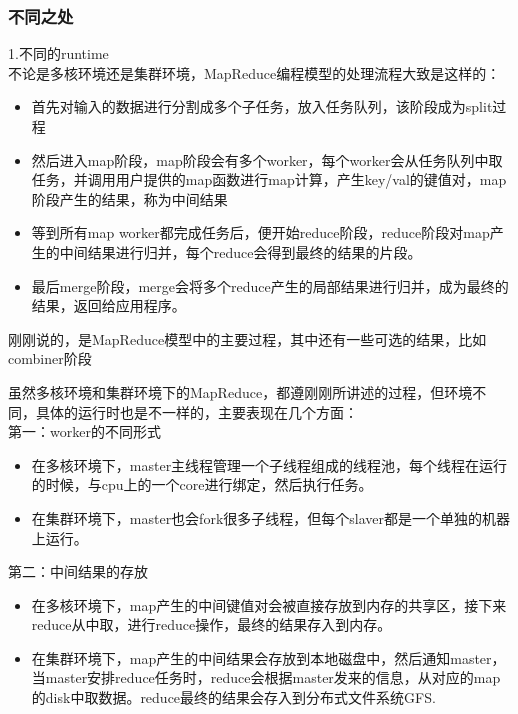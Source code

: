 \subsubsection{不同之处}
1.不同的runtime\\
不论是多核环境还是集群环境，MapReduce编程模型的处理流程大致是这样的：
\begin{itemize}
  \item 首先对输入的数据进行分割成多个子任务，放入任务队列，该阶段成为split过程
  \item 然后进入map阶段，map阶段会有多个worker，每个worker会从任务队列中取任务，并调用用户提供的map函数进行map计算，产生key/val的键值对，map阶段产生的结果，称为中间结果
  \item 等到所有map worker都完成任务后，便开始reduce阶段，reduce阶段对map产生的中间结果进行归并，每个reduce会得到最终的结果的片段。
  \item 最后merge阶段，merge会将多个reduce产生的局部结果进行归并，成为最终的结果，返回给应用程序。
\end{itemize}
刚刚说的，是MapReduce模型中的主要过程，其中还有一些可选的结果，比如combiner阶段

虽然多核环境和集群环境下的MapReduce，都遵刚刚所讲述的过程，但环境不同，具体的运行时也是不一样的，主要表现在几个方面：
\\
第一：worker的不同形式
\begin{itemize}
  \item 在多核环境下，master主线程管理一个子线程组成的线程池，每个线程在运行的时候，与cpu上的一个core进行绑定，然后执行任务。
  \item 在集群环境下，master也会fork很多子线程，但每个slaver都是一个单独的机器上运行。
\end{itemize}

第二：中间结果的存放
\begin{itemize}
  \item 在多核环境下，map产生的中间键值对会被直接存放到内存的共享区，接下来reduce从中取，进行reduce操作，最终的结果存入到内存。
  \item 在集群环境下，map产生的中间结果会存放到本地磁盘中，然后通知master，当master安排reduce任务时，reduce会根据master发来的信息，从对应的map的disk中取数据。reduce最终的结果会存入到分布式文件系统GFS.
\end{itemize}


